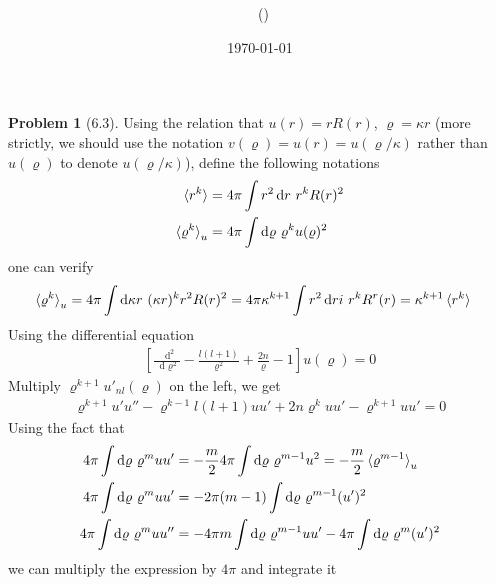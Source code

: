 \documentclass[twoside,11pt]{article}
\title{{\lms \Code \ \Ass}}
\author{\lms \name \ (\href{mailto:\mail}{\mail})}
\date{\sffamily \today}
\makeatletter
\renewcommand*\d{\mathop{}\!\mathrm{d}}
\theoremstyle{definition}
\newtheorem{problem}{Problem}
\theoremstyle{remark}
\newtheorem*{remark}{Remark}
\renewcommand{\maketitle}{\bgroup\setlength{\parindent}{0pt}
\begin{flushleft}
  \textbf{\Large\@title}

  \@author
\end{flushleft}\egroup
}
\makeatother
\begin{document}
\maketitle
\thispagestyle{title}


\begin{problem}[6.3]
Using the relation that $u(r) = rR(r)$, $\varrho=\kappa r$
(more strictly, we should use the notation $v(\varrho)=u(r)=u(\varrho/\kappa)$ rather than $u(\varrho)$
to denote $u(\varrho/\kappa)$),
define the following notations
\begin{align*}
    \braket{r^k} &= 4\pi \int r^2\d r\ r^k R(r)^2\\
    \braket{\varrho^k}_u &= 4\pi\int\d \varrho\ \varrho^k u(\varrho)^2
\end{align*}
one can verify
\begin{align*}
    \braket{\varrho^k}_u &= 4\pi\int\d \kappa r\ (\kappa r)^k r^2 R(r)^2
    =4\pi\kappa^{k+1} \int r^2\d ri\ r^kR^r(r) = \kappa^{k+1}\braket{r^k}
\end{align*}
Using the differential equation
\begin{align}
    \left[
        \frac{\d^2}{\d\varrho^2} - \frac{l(l+1)}{\varrho^2} + \frac{2n}{\varrho} - 1
    \right]u(\varrho) = 0
\end{align}
Multiply $\varrho^{k+1}u'_{nl}(\varrho)$ on the left, we get
\begin{align*}
    \varrho^{k+1}u'u'' - \varrho^{k-1}l(l+1)uu' + 2n\varrho^k uu' - \varrho^{k+1}uu' = 0
\end{align*}
Using the fact that
\begin{align*}
    4\pi\int\d\varrho\ \varrho^m uu' &= -\frac{m}{2}4\pi\int\d\varrho\ \varrho^{m-1}u^2
    = -\frac{m}{2}\braket{\varrho^{m-1}}_u\\
    4\pi\int\d\varrho\ \varrho^m uu' &= -2\pi(m-1)\int\d\varrho\ \varrho^{m-1} (u')^2\\
    4\pi\int\d\varrho\ \varrho^m uu'' &= -4\pi m\int\d\varrho\ \varrho^{m-1}uu' -4\pi\int\d\varrho\
    \varrho^m (u')^2
\end{align*}
we can multiply the expression by $4\pi$ and integrate it

\end{problem}
\end{document}
